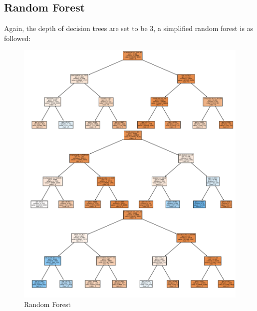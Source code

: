\documentclass[11pt,a4paper]{article}
\begin{document}
    \newpage
    \subsection{Random Forest} \label{random_forest}
    Again, the depth of decision trees are set to be 3, a simplified random forest is as followed:
    


    \begin{figure}[!ht]
        \centering
        \includegraphics[width = \textwidth]{plot/classification/random_forest.pdf}
        \caption{Random Forest}
        \label{fig:random_forest}
    \end{figure}
    
\end{document}
